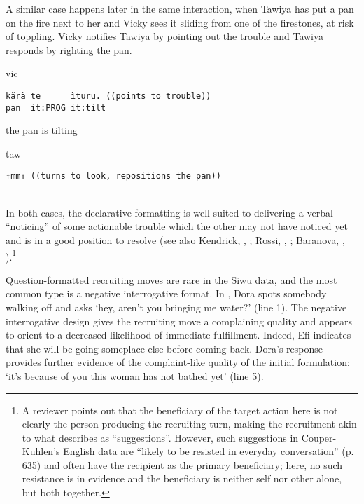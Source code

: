 \documentclass[output=paper]{langsci/langscibook}
\begin{document}
\normalsize
A similar case happens later in the same interaction, when Tawiya has put a pan on the fire next to her and Vicky sees it sliding from one of the firestones, at risk of toppling. Vicky notifies Tawiya by pointing out the trouble and Tawiya responds by righting the pan.

\vspace{2mm}
%
%
\begin{mdframednoverticalspace}[style=firstfoc]
\begin{transbox}{2}{vic}
\begin{verbatim}
kãrã te      ìturu. ((points to trouble))
pan  it:PROG it:tilt
\end{verbatim}
the pan is tilting
\end{transbox}
\end{mdframednoverticalspace}
%
\begin{transbox}{3}{taw}
\begin{verbatim}
↑mm↑ ((turns to look, repositions the pan))
\end{verbatim}
\end{transbox}\\

\normalsize
In both cases, the declarative formatting is well suited to delivering a verbal “noticing” of some actionable trouble which the other may not have noticed yet and is in a good position to resolve (see also Kendrick, , ; Rossi, , ; Baranova, , ).\footnote{A reviewer points out that the beneficiary of the target action here is not clearly the person producing the recruiting turn, making the recruitment akin to what \citet{couper-kuhlen_what_2014} describes as “suggestions”. However, such suggestions in Couper-Kuhlen’s English data are “likely to be resisted in everyday conversation” (p. 635) and often have the recipient as the primary beneficiary; here, no such resistance is in evidence and the beneficiary is neither self nor other alone, but both together.}



Question-formatted recruiting moves are rare in the Siwu data, and the most common type is a negative interrogative format. In , Dora spots somebody walking off and asks ‘hey, aren’t you bringing me water?’ (line 1). The negative interrogative design gives the recruiting move a complaining quality \citep{heinemann_will_2006} and appears to orient to a decreased likelihood of immediate fulfillment. Indeed, Efi indicates that she will be going someplace else before coming back. Dora’s response provides further evidence of the complaint-like quality of the initial formulation: ‘it’s because of you this woman has not bathed yet’ (line 5).
\end{document}
